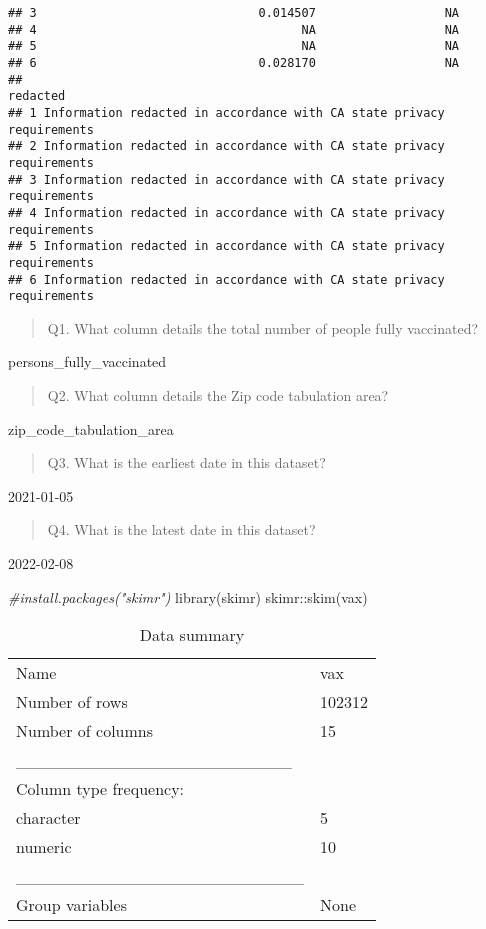 \documentclass[
]{article}
\newenvironment{Shaded}{\begin{snugshade}}{\end{snugshade}}
\newcommand{\CommentTok}[1]{\textcolor[rgb]{0.56,0.35,0.01}{\textit{#1}}}
\newcommand{\FunctionTok}[1]{\textcolor[rgb]{0.00,0.00,0.00}{#1}}
\newcommand{\NormalTok}[1]{#1}
\newcommand{\SpecialCharTok}[1]{\textcolor[rgb]{0.00,0.00,0.00}{#1}}
\begin{document}
\begin{verbatim}
## 3                               0.014507                  NA
## 4                                     NA                  NA
## 5                                     NA                  NA
## 6                               0.028170                  NA
##                                                                redacted
## 1 Information redacted in accordance with CA state privacy requirements
## 2 Information redacted in accordance with CA state privacy requirements
## 3 Information redacted in accordance with CA state privacy requirements
## 4 Information redacted in accordance with CA state privacy requirements
## 5 Information redacted in accordance with CA state privacy requirements
## 6 Information redacted in accordance with CA state privacy requirements
\end{verbatim}

\begin{quote}
Q1. What column details the total number of people fully vaccinated?
\end{quote}

persons\_fully\_vaccinated

\begin{quote}
Q2. What column details the Zip code tabulation area?
\end{quote}

zip\_code\_tabulation\_area

\begin{quote}
Q3. What is the earliest date in this dataset?
\end{quote}

2021-01-05

\begin{quote}
Q4. What is the latest date in this dataset?
\end{quote}

2022-02-08

\begin{Shaded}
\begin{Highlighting}[]
\CommentTok{\#install.packages("skimr")}
\FunctionTok{library}\NormalTok{(skimr)}
\NormalTok{skimr}\SpecialCharTok{::}\FunctionTok{skim}\NormalTok{(vax)}
\end{Highlighting}
\end{Shaded}

\begin{longtable}[]{@{}ll@{}}
\caption{Data summary}\tabularnewline
\toprule
\endhead
Name & vax \\
Number of rows & 102312 \\
Number of columns & 15 \\
\_\_\_\_\_\_\_\_\_\_\_\_\_\_\_\_\_\_\_\_\_\_\_ & \\
Column type frequency: & \\
character & 5 \\
numeric & 10 \\
\_\_\_\_\_\_\_\_\_\_\_\_\_\_\_\_\_\_\_\_\_\_\_\_ & \\
Group variables & None \\
\bottomrule
\end{longtable}
\end{document}
